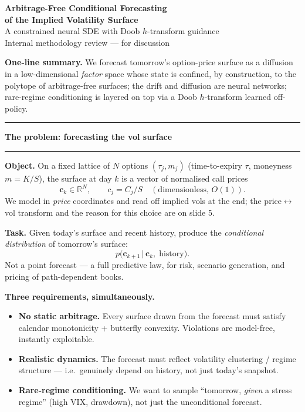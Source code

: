 \documentclass[12pt]{article}
\newcommand{\slide}[1]{%
  \par\noindent\rule{\linewidth}{1.2pt}\par\vspace{2pt}%
  {\LARGE\bfseries #1}\par\vspace{2pt}%
  \noindent\rule{\linewidth}{0.5pt}\par\vspace{8pt}}
\newcommand{\R}{\mathbb{R}}
\begin{document}
\thispagestyle{empty}
\vspace*{0.5in}
\begin{center}
{\huge\bfseries Arbitrage-Free Conditional Forecasting\\[6pt]
of the Implied Volatility Surface}\\[18pt]
{\Large A constrained neural SDE with Doob $h$-transform guidance}\\[28pt]
{\large Internal methodology review --- for discussion}\\[10pt]
\end{center}
\vfill
\begin{center}
\begin{minipage}{0.85\linewidth}
\small
\textbf{One-line summary.} We forecast tomorrow's option-price surface as a
diffusion in a low-dimensional \emph{factor} space whose state is confined,
by construction, to the polytope of arbitrage-free surfaces; the drift and
diffusion are neural networks; rare-regime conditioning is layered on top
via a Doob $h$-transform learned off-policy.
\end{minipage}
\end{center}
\vfill
\clearpage

\slide{The problem: forecasting the vol surface}

\textbf{Object.} On a fixed lattice of $N$ options $(\tau_j, m_j)$
(time-to-expiry $\tau$, moneyness $m=K/S$), the surface at day $k$ is a
vector of normalised call prices
\[
\mathbf c_k \in \R^N, \qquad c_j = C_j / S \quad (\text{dimensionless, } O(1)).
\]
We model in \emph{price} coordinates and read off implied vols at the end;
the price$\leftrightarrow$vol transform and the reason for this choice are
on slide 5.

\vspace{6pt}
\textbf{Task.} Given today's surface and recent history, produce the
\emph{conditional distribution} of tomorrow's surface:
\[
p\bigl(\mathbf c_{k+1} \,\big|\, \mathbf c_k,\; \text{history}\bigr).
\]
Not a point forecast --- a full predictive law, for risk, scenario
generation, and pricing of path-dependent books.

\vspace{6pt}
\textbf{Three requirements, simultaneously.}
\begin{itemize}
\item[(R1)] \textbf{No static arbitrage.} Every surface drawn from the
  forecast must satisfy calendar monotonicity + butterfly convexity.
  Violations are model-free, instantly exploitable.
\item[(R2)] \textbf{Realistic dynamics.} The forecast must reflect
  volatility clustering / regime structure --- i.e.\ genuinely depend on
  history, not just today's snapshot.
\item[(R3)] \textbf{Rare-regime conditioning.} We want to sample
  ``tomorrow, \emph{given} a stress regime'' (high VIX, drawdown), not just
  the unconditional forecast.
\end{itemize}
\end{document}
